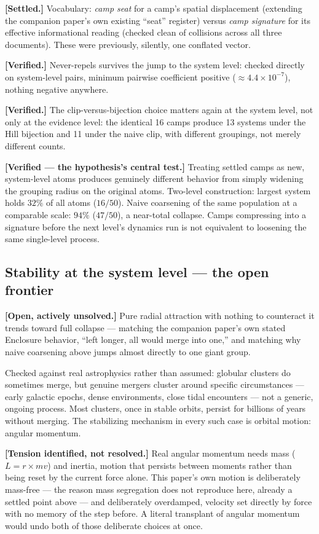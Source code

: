 \documentclass[12pt, a4paper]{article}
\begin{document}
\textbf{[Settled.]} Vocabulary: \emph{camp seat} for a camp's spatial
displacement (extending the companion paper's own existing ``seat''
register) versus \emph{camp signature} for its effective
informational reading (checked clean of collisions across all three
documents). These were previously, silently, one conflated vector.

\textbf{[Verified.]} Never-repels survives the jump to the system
level: checked directly on system-level pairs, minimum pairwise
coefficient positive ($\approx4.4\times10^{-7}$), nothing negative
anywhere.

\textbf{[Verified.]} The clip-versus-bijection choice matters again
at the system level, not only at the evidence level: the identical
16 camps produce 13 systems under the Hill bijection and 11 under
the naive clip, with different groupings, not merely different
counts.

\textbf{[Verified --- the hypothesis's central test.]} Treating
settled camps as new, system-level atoms produces genuinely different
behavior from simply widening the grouping radius on the original
atoms. Two-level construction: largest system holds $32\%$ of all
atoms ($16/50$). Naive coarsening of the same population at a
comparable scale: $94\%$ ($47/50$), a near-total collapse. Camps
compressing into a signature before the next level's dynamics run is
not equivalent to loosening the same single-level process.

\subsection*{Stability at the system level --- the open frontier}

\textbf{[Open, actively unsolved.]} Pure radial attraction with
nothing to counteract it trends toward full collapse --- matching the
companion paper's own stated Enclosure behavior, ``left longer, all
would merge into one,'' and matching why naive coarsening above jumps
almost directly to one giant group.

Checked against real astrophysics rather than assumed: globular
clusters do sometimes merge, but genuine mergers cluster around
specific circumstances --- early galactic epochs, dense environments,
close tidal encounters --- not a generic, ongoing process. Most
clusters, once in stable orbits, persist for billions of years
without merging. The stabilizing mechanism in every such case is
orbital motion: angular momentum.

\textbf{[Tension identified, not resolved.]} Real angular momentum
needs mass ($L=r\times mv$) and inertia, motion that persists between
moments rather than being reset by the current force alone. This
paper's own motion is deliberately mass-free --- the reason mass
segregation does not reproduce here, already a settled point above
--- and deliberately overdamped, velocity set directly by force with
no memory of the step before. A literal transplant of angular
momentum would undo both of those deliberate choices at once.
\end{document}
